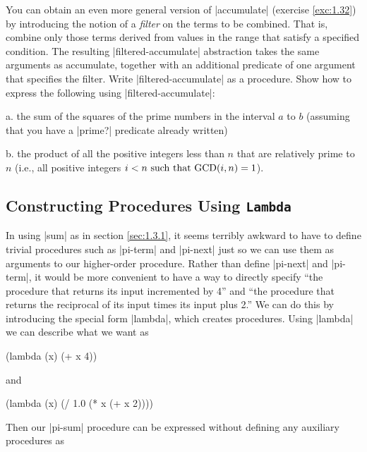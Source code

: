 \begin{Exercise}
\label{exc:1.33}
You can obtain an even more general version of \scheme|accumulate|
(exercise \ref{exc:1.32}) by introducing the notion of a
\textit{filter} on the terms to be combined.  That is, combine only
those terms derived from values in the range that satisfy a specified
condition.  The resulting \scheme|filtered-accumulate| abstraction
takes the same arguments as accumulate, together with an additional
predicate of one argument that specifies the filter.  Write
\scheme|filtered-accumulate| as a procedure.  Show how to express the
following using \scheme|filtered-accumulate|:

a. the sum of the squares of the prime numbers in the interval $a$ to
$b$ (assuming that you have a \scheme|prime?| predicate already written)

b. the product of all the positive integers less than $n$
that are relatively prime to $n$ (i.e., all positive integers
$i < n {\rm ~such~that~GCD}(i,n) = 1$).
\end{Exercise}


\subsection{Constructing Procedures Using {\tt Lambda}}
\label{sec:1.3.2}




In using \scheme|sum| as in section \ref{sec:1.3.1},
it seems terribly awkward to have to define trivial procedures such as
\scheme|pi-term| and \scheme|pi-next| just so we can use them as arguments to
our higher-order procedure.  Rather than define \scheme|pi-next| and \scheme|pi-term|, it would be more convenient
to have a way to directly specify ``the procedure that returns its
input incremented by 4'' and ``the procedure that returns the
reciprocal of its input times its input plus 2.''  We can do this by
introducing the special form \scheme|lambda|, which creates procedures.
Using \scheme|lambda| we can describe what we want as

\begin{schemedisplay}
(lambda (x) (+ x 4))
\end{schemedisplay}
and 

\begin{schemedisplay}
(lambda (x) (/ 1.0 (* x (+ x 2))))
\end{schemedisplay}
Then our \scheme|pi-sum| procedure can be expressed without defining any
auxiliary procedures as

